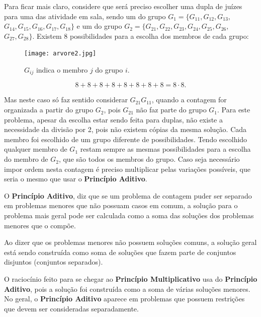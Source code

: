 Para ficar mais claro, considere que será preciso escolher uma dupla de juízes para uma das atividade em sala, sendo um do grupo $G_1=\{G_{11},G_{12},G_{13},$
$G_{14},G_{15},G_{16},G_{17},G_{18}\}$ e um do grupo $G_2=\{G_{21},G_{22},G_{23},
G_{24},G_{25},G_{26},$ $G_{27},G_{28}\}$. Existem 8 possibilidades para a escolha dos membros de cada grupo:


\begin{figure}[H]
\centering


\texttt{[image: arvore2.jpg]}
\caption{$G_{ij}$ indica o membro $j$ do grupo $i$.}
\end{figure}

 $$8+8+8+8+8+8+8+8=  8 \cdot 8.$$
 
Mas neste caso só faz sentido considerar $G_{21}G_{11}$, quando a contagem for organizada a partir do grupo $G_2$, pois $G_{21}$ não faz parte do grupo $G_1$. Para este problema, apesar da escolha estar sendo feita para duplas, não existe a necessidade da divisão por 2, pois não existem cópias da mesma solução. Cada membro foi escolhido de um grupo diferente de possibilidades. Tendo escolhido qualquer membro de $G_1$ restam sempre as mesmas possibilidades para a escolha do membro de $G_2$, que são todos os membros do grupo. Caso seja necessário impor ordem nesta contagem é preciso multiplicar pelas variações possíveis, que seria o mesmo que usar o \textbf{Princípio Aditivo}.

O \textbf{Princípio Aditivo}, diz que se um problema de contagem puder ser separado em problemas menores que não possuam casos em comum, a solução para o problema mais geral pode ser calculada como a soma das soluções dos problemas menores que o compõe. 

Ao dizer que os problemas menores não possuem soluções comuns, a solução geral está sendo construída como soma de soluções que fazem parte de conjuntos disjuntos (conjuntos separados). 

O raciocínio feito para se chegar ao \textbf{Princípio Multiplicativo}  usa do \textbf{Princípio   Aditivo},  pois a solução foi construída como a soma de várias soluções menores. No geral, o \textbf{Princípio Aditivo} aparece em problemas que possuem restrições que devem ser consideradas separadamente. 


